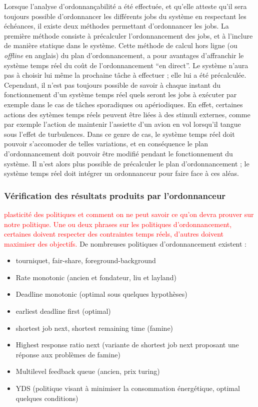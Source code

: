 		Lorsque l'analyse d'ordonnançabilité a été effectuée, et qu'elle atteste qu'il sera toujours possible d'ordonnancer les différents jobs du système en respectant les échéances, il existe deux méthodes permettant d'ordonnancer les jobs. La première méthode consiste à précalculer l'ordonnancement des jobs, et à l'inclure de manière statique dans le système. Cette méthode de calcul hors ligne (ou \emph{offline} en anglais) du plan d'ordonnancement, a pour avantages d'affranchir le système temps réel du coût de l'ordonnancement ``en direct''. Le système n'aura pas à choisir lui même la prochaine tâche à effectuer ; elle lui a été précalculée. Cependant, il n'est pas toujours possible de savoir à chaque instant du fonctionnement d'un système temps réel quels seront les jobs à exécuter par exemple dans le cas de tâches sporadiques ou apériodiques. En effet, certaines actions des sytèmes temps réels peuvent être liées à des stimuli externes, comme par exemple l'action de maintenir l'assiette d'un avion en vol lorsqu'il tangue sous l'effet de turbulences. Dans ce genre de cas, le système temps réel doit pouvoir s'accomoder de telles variations, et en conséquence le plan d'ordonnancement doit pouvoir être modifié pendant le fonctionnement du système. Il n'est alors plus possible de précalculer le plan d'ordonnancement ; le système temps réel doit intégrer un ordonnanceur pour faire face à ces aléas.

		\subsubsection{Vérification des résultats produits par l'ordonnanceur}
		\textcolor{red}{plasticité des politiques et comment on ne peut savoir ce qu'on devra prouver sur notre politique. Une ou deux phrases sur les politiques d'ordonnancement, certaines doivent respecter des contraintes temps réels, d'autres doivent maximiser des objectifs.}
		De nombreuses politiques d'ordonnancement existent :
		\begin{itemize}
			\item{tourniquet, fair-share, foreground-background }
			\item{Rate monotonic (ancien et fondateur, liu et layland)}
			\item{Deadline monotonic (optimal sous quelques hypothèses)}
			\item{earliest deadline first (optimal)}
			\item{shortest job next, shortest remaining time (famine)}
			\item{Highest response ratio next (variante de shortest job next proposant une réponse aux problèmes de famine)}
			\item{Multilevel feedback queue (ancien, prix turing)}
			\item{YDS (politique visant à minimiser la consommation énergétique, optimal quelques conditions)}
		\end{itemize}

